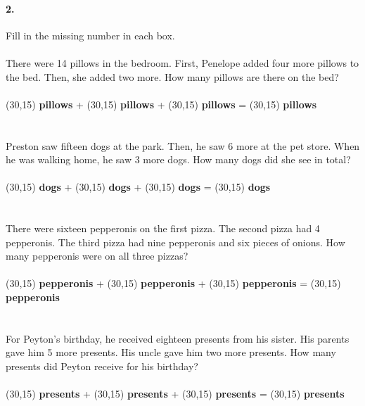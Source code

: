 \documentclass[12pt]{article}
\begin{document}
\newpage

\paragraph{2.}
Fill in the missing number in each box. \\
\\
There were 14 pillows in the bedroom. First, Penelope added four more pillows to the bed. Then, she added two more. How many pillows are there on the bed?
\\
\\
\framebox(30,15){} \textbf{pillows} + \framebox(30,15){} \textbf{pillows} + \framebox(30,15){} \textbf{pillows} = \framebox(30,15){} \textbf{pillows}
\\
\\
\\
Preston saw fifteen dogs at the park. Then, he saw 6 more at the pet store. When he was walking home, he saw 3 more dogs. How many dogs did she see in total?
\\
\\
\framebox(30,15){} \textbf{dogs} + \framebox(30,15){} \textbf{dogs} + \framebox(30,15){} \textbf{dogs} = \framebox(30,15){} \textbf{dogs}
\\
\\
\\
There were sixteen pepperonis on the first pizza. The second pizza had 4 pepperonis. The third pizza had nine pepperonis and six pieces of onions. How many pepperonis were on all three pizzas?
\\
\\
\framebox(30,15){} \textbf{pepperonis} + \framebox(30,15){} \textbf{pepperonis} + \framebox(30,15){} \textbf{pepperonis} = \framebox(30,15){} \textbf{pepperonis}
\\
\\
\\
For Peyton's birthday, he received eighteen presents from his sister. His parents gave him 5 more presents. His uncle gave him two more presents. How many presents did Peyton receive for his birthday?
\\
\\
\framebox(30,15){} \textbf{presents} + \framebox(30,15){} \textbf{presents} + \framebox(30,15){} \textbf{presents} = \framebox(30,15){} \textbf{presents}
\end{document}
